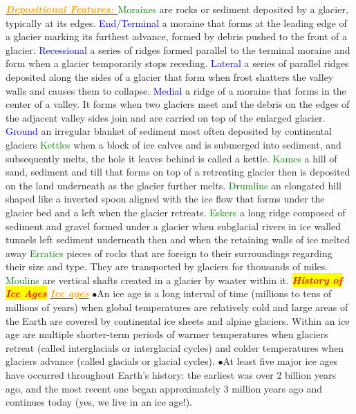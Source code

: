 \documentclass{article}
\newcommand{\ddd}{$\bullet$}
\newcommand{\red}[1]{\textcolor{red}{#1}}
\newcommand{\green}[1]{\textcolor{green}{#1}}
\newcommand{\blue}[1]{\textcolor{blue}{#1}}
\newcommand{\orange}[1]{\textcolor{orange}{#1}}
\newcommand{\mysection}[1]{\colorbox{yellow}{\textbf{\textit{\red{#1}}}}}
\newcommand{\mysub}[1]{\underline{\textbf{{\textit{\orange{#1}}}}}}
\newcommand{\mysubsub}[1]{{{\green{#1}}}}
\newcommand{\mysubsubsub}[1]{{{\blue{#1}}}}
\begin{document}
\begin{multicols*}{4}
	 	    \mysub{Depositional Features: }
			\mysubsub{Moraines} are rocks or sediment deposited by a glacier, typically at its edges.
			\mysubsubsub{End/Terminal} a moraine that forms at the leading edge of a glacier marking its furthest advance, formed by debris pushed to the front of a glacier.
			\mysubsubsub{Recessional} a series of ridges formed parallel to the terminal moraine and form when a glacier temporarily stops receding.
			\mysubsubsub{Lateral} a series of parallel ridges deposited along the sides of a glacier that form when frost shatters the valley walls and causes them to collapse.
			\mysubsubsub{Medial}  a ridge of a moraine that forms in the center of a valley. It forms when two glaciers meet and the debris on the edges of the adjacent valley sides join and are carried on top of the enlarged glacier.
			\mysubsubsub{Ground} an irregular blanket of sediment most often deposited by continental glaciers
			\mysubsub{Kettles} when a block of ice calves and is submerged into sediment, and subsequently melts, the hole it leaves behind is called a kettle.
			\mysubsub{Kames} a hill of sand, sediment and till that forms on top of a retreating glacier then is deposited on the land underneath as the glacier further melts.
			\mysubsub{Drumlins} an elongated hill shaped like a inverted spoon aligned with the ice flow that forms under the glacier bed and a left when the glacier retreats.
			\mysubsub{Eskers} a long ridge composed of sediment and gravel formed under a glacier when subglacial rivers in ice walled tunnels left sediment underneath then and when the retaining walls of ice melted away
			\mysubsub{Erratics} pieces of rocks that are foreign to their surroundings regarding their size and type. They are transported by glaciers for thousands of miles.
			\mysubsub{Moulins} are vertical shafts created in a glacier by waater within it.
        \mysection{History of Ice Ages}
            \mysub{Ice ages}
                \ddd An ice age is a long interval of time (millions to tens of millions of years) when global temperatures are relatively cold and large areas of the Earth are covered by continental ice sheets and alpine glaciers. Within an ice age are multiple shorter-term periods of warmer temperatures when glaciers retreat (called interglacials or interglacial cycles) and colder temperatures when glaciers advance (called glacials or glacial cycles).
                \ddd At least five major ice ages have occurred throughout Earth’s history: the earliest was over 2 billion years ago, and the most recent one began approximately 3 million years ago and continues today (yes, we live in an ice age!).

\end{multicols*}
\end{document}
